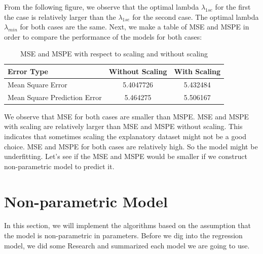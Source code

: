 \documentclass[11pt]{article}
\begin{document}
\noindent From the following figure, we observe that the optimal lambda $\lambda_{1se}$ for the first the case is relatively larger than the $\lambda_{1se}$ for the second case. The optimal lambda $\lambda_{min}$ for both cases are the same. Next, we make a table of MSE and MSPE in order to compare the performance of the models for both cases:
\begin{table}[h]
    \label{default_model}
    \centering
    \begin{tabular}{l c c}
        \hline
        \textbf{Error Type} & \textbf{Without Scaling} & \textbf{With Scaling} \\ \hline
        Mean Square Error & 5.4047726 & 5.432484 \\
        Mean Square Prediction Error  & 5.464275 & 5.506167 \\
        \hline
    \end{tabular}
    \caption{MSE and MSPE with respect to scaling and without scaling}
\end{table}
We observe that MSE for both cases are smaller than MSPE. MSE and MSPE with scaling are relatively larger than MSE and MSPE without scaling. This indicates that sometimes scaling the explanatory dataset might not be a good choice. MSE and MSPE for both cases are relatively high. So the model might be underfitting. Let's see if the MSE and MSPE would be smaller if we construct non-parametric model to predict it.


\section{Non-parametric Model}

In this section, we will implement the algorithms based on the assumption that the model is non-parametric in parameters. Before we dig into the regression model, we did some Research and summarized each model we are going to use.
\end{document}
